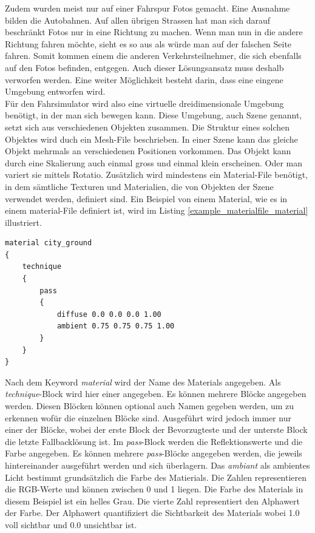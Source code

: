 Zudem wurden meist nur auf einer Fahrspur Fotos gemacht. Eine Ausnahme bilden die Autobahnen. Auf allen übrigen Strassen hat man sich darauf beschränkt Fotos nur in eine Richtung zu machen. Wenn man nun in die andere Richtung fahren möchte, sieht es so aus als würde man auf der falschen Seite fahren. Somit kommen einem die anderen Verkehrsteilnehmer, die sich ebenfalls auf den Fotos befinden, entgegen. Auch dieser Lösungsansatz muss deshalb verworfen werden. Eine weiter Möglichkeit besteht darin, dass eine eingene Umgebung entworfen wird.\\
Für den Fahrsimulator wird also eine virtuelle dreidimensionale Umgebung benötigt, in der man sich bewegen kann. Diese Umgebung, auch Szene genannt, setzt sich aus verschiedenen Objekten zusammen. Die Struktur eines solchen Objektes wird duch ein Mesh-File beschrieben. In einer Szene kann das gleiche Objekt mehrmals an verschiedenen Positionen vorkommen. Das Objekt kann durch eine Skalierung auch einmal gross und einmal klein erscheinen. Oder man variert sie mittels Rotatio. Zusätzlich wird mindestens ein Material-File benötigt, in dem sämtliche Texturen und Materialien, die von Objekten der Szene verwendet werden, definiert sind.
Ein Beispiel von einem Material, wie es in einem material-File definiert ist, wird im Listing \ref{example_materialfile_material} illustriert.
\begin{lstlisting}[caption={Beispiel aus dem material-File für ein Material},label={example_materialfile_material}]
material city_ground
{
	technique
	{
		pass
		{
			diffuse 0.0 0.0 0.0 1.00
			ambient 0.75 0.75 0.75 1.00	
		}
	}
}
\end{lstlisting}
Nach dem Keyword \textit{material} wird der Name des Materials angegeben. Als \textit{technique}-Block wird hier einer angegeben. Es können mehrere Blöcke angegeben werden. Diesen Blöcken können optional auch Namen gegeben werden, um zu erkennen wofür die einzelnen Blöcke sind. Ausgeführt wird jedoch immer nur einer der Blöcke, wobei der erste Block der Bevorzugteste und der unterste Block die letzte Fallbacklösung ist. Im \textit{pass}-Block werden die Reflektionswerte und die Farbe angegeben. Es können mehrere \textit{pass}-Blöcke angegeben werden, die jeweils hintereinander ausgeführt werden und sich überlagern. Das \textit{ambiant} als ambientes Licht bestimmt grundsätzlich die Farbe des Matierials. Die Zahlen representieren die RGB-Werte und können zwischen 0 und 1 liegen. Die Farbe des Materials in diesem Beispiel ist ein helles Grau. Die vierte Zahl representiert den Alphawert der Farbe. Der Alphawert quantifiziert die Sichtbarkeit des Materials wobei 1.0 voll sichtbar und 0.0 unsichtbar ist.
